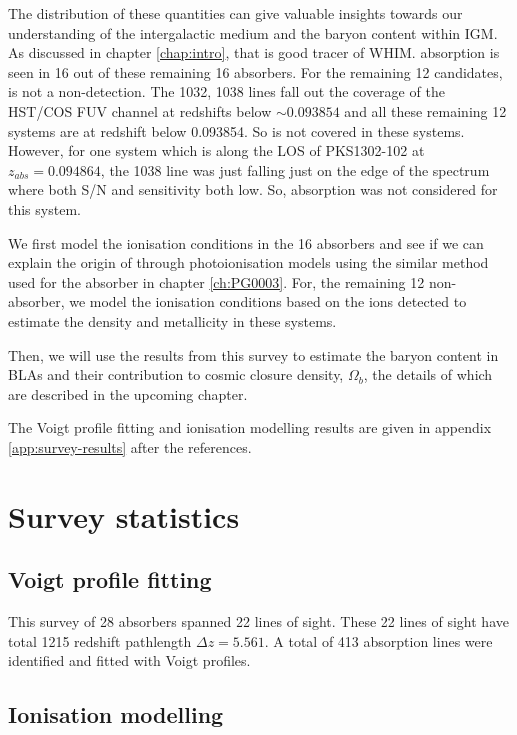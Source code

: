 The distribution of these quantities can give valuable insights towards our understanding of the intergalactic medium and the baryon content within IGM. As discussed in chapter \ref{chap:intro}, that  is good tracer of WHIM.  absorption is seen in 16 out of these remaining 16 absorbers. For the remaining 12 candidates,  is not a non-detection. The  1032, 1038 lines fall out the coverage of the HST/COS FUV channel at redshifts below $\sim 0.093854$ and all these remaining 12 systems are at redshift below 0.093854. So  is not covered in these systems. However, for one system which is along the LOS of PKS1302-102 at $z_{abs}=0.094864$, the  1038 line was just falling just on the edge of the spectrum where both S/N and sensitivity both low. So,  absorption was not considered for this system. 

We first model the ionisation conditions in the 16  absorbers and see if we can explain the origin of  through photoionisation models using the similar method used for the absorber in chapter \ref{ch:PG0003}. For, the remaining 12 non- absorber, we model the ionisation conditions based on the ions detected to estimate the density and metallicity in these systems. 

Then, we will use the results from this survey to estimate the baryon content in BLAs and their contribution to cosmic closure density, $\Omega_b$, the details of which are described in the upcoming chapter.

The Voigt profile fitting and ionisation modelling results are given in appendix \ref{app:survey-results} after the references.


\section{Survey statistics}

\subsection{Voigt profile fitting}

This survey of 28 absorbers spanned 22 lines of sight. These 22 lines of sight have total  1215 redshift pathlength $\Delta z = 5.561$. A total of 413 absorption lines were identified and fitted with Voigt profiles.

\subsection{Ionisation modelling}





